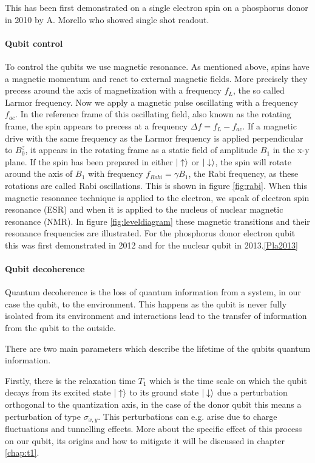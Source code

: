 This has been first demonstrated on a single electron spin on a phosphorus donor in 2010 by A. Morello who showed single shot readout.\cite{Morello2010}

\paragraph*{Qubit control} 
To control the qubits we use magnetic resonance. As mentioned above, spins have a magnetic momentum and react to external magnetic fields. More precisely they precess around the axis of magnetization with a frequency $f_L$, the so called Larmor frequency. Now we apply a magnetic pulse oscillating with a frequency $f_{ac}$. In the reference frame of this oscillating  field, also known as the rotating frame, the spin appears to precess at a frequency $\Delta f=f_L-f_{ac}$.  If a magnetic drive with the same frequency as the Larmor frequency is applied perpendicular to $B_0^z$, it appears in the rotating frame as a static field of amplitude $B_1$ in the x-y plane. If the spin has been prepared in either $|\uparrow\rangle$ or $|\downarrow\rangle$, the spin will rotate around the axis of $B_1$ with frequency $f_{Rabi}=\gamma B_1$, the Rabi frequency, as these rotations are called Rabi oscillations. This is shown in figure \ref{fig:rabi}. 
When this magnetic resonance technique is applied to the electron, we speak of electron spin resonance (ESR) and when it is applied to the nucleus of nuclear magnetic resonance (NMR).
In figure \ref{fig:leveldiagram} these magnetic transitions and their resonance frequencies are illustrated. 
For the phosphorus donor electron qubit this was first demonstrated in 2012\cite{Pla2012} and for the nuclear qubit in 2013.\ref{Pla2013}



\paragraph*{Qubit decoherence}

Quantum decoherence is the loss of quantum information from a system, in our case the qubit, to the environment.
This happens as the qubit is never fully isolated from its environment and interactions lead to the transfer of information from the qubit to the outside. 

There are two main parameters which describe the lifetime of the qubits quantum information. 

Firstly, there is the relaxation time $T_1$ which is the time scale on which the qubit decays from its excited state $|\uparrow\rangle$ to its ground state $|\downarrow\rangle$ due a perturbation orthogonal to the quantization axis, in the case of the donor qubit this means a perturbation of type $\sigma_{x,y}$. This perturbations can e.g. arise due to charge fluctuations and tunnelling effects. More about the specific effect of this process on our qubit, its origins and how to mitigate it will be discussed in chapter \ref{chap:t1}. 

